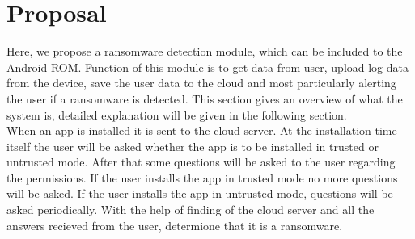 %
%

\chapter{Proposal}

Here, we propose a ransomware detection module, which can be included to the Android ROM. 
Function of this module is to get data from user, upload log data from the device, save the user data to the cloud and most particularly alerting the user if a ransomware is detected. 
This section gives an overview of what the system is, detailed explanation will be given in the following section.\\

When an app is installed it is sent to the cloud server.
At the installation time itself the user will be asked whether the app is to be installed in trusted or untrusted mode.
After that some questions will be asked to the user regarding the permissions.
If the user installs the app in trusted mode no more questions will be asked.
If the user installs the app in untrusted mode, questions will be asked periodically.
With the help of finding of the cloud server and all the answers recieved from the user, determione that it is a ransomware.